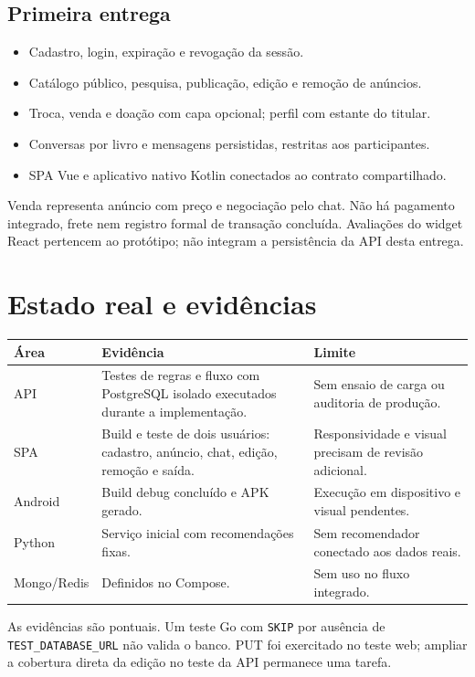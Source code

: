\documentclass[11pt,a4paper]{article}
\begin{document}
\subsection{Primeira entrega}
\begin{itemize}
\item Cadastro, login, expiração e revogação da sessão.
\item Catálogo público, pesquisa, publicação, edição e remoção de anúncios.
\item Troca, venda e doação com capa opcional; perfil com estante do titular.
\item Conversas por livro e mensagens persistidas, restritas aos participantes.
\item SPA Vue e aplicativo nativo Kotlin conectados ao contrato compartilhado.
\end{itemize}
Venda representa anúncio com preço e negociação pelo chat. Não há pagamento integrado, frete nem registro formal de transação concluída. Avaliações do widget React pertencem ao protótipo; não integram a persistência da API desta entrega.
\section{Estado real e evidências}
\par\medskip\noindent\begin{tabularx}{\textwidth}{@{}p{25mm}Y >{\raggedright\arraybackslash}p{42mm}@{}}\toprule Área & Evidência & Limite\\\midrule
API & Testes de regras e fluxo com PostgreSQL isolado executados durante a implementação. & Sem ensaio de carga ou auditoria de produção.\\
SPA & Build e teste de dois usuários: cadastro, anúncio, chat, edição, remoção e saída. & Responsividade e visual precisam de revisão adicional.\\
Android & Build debug concluído e APK gerado. & Execução em dispositivo e visual pendentes.\\
Python & Serviço inicial com recomendações fixas. & Sem recomendador conectado aos dados reais.\\
Mongo/Redis & Definidos no Compose. & Sem uso no fluxo integrado.\\\bottomrule\end{tabularx}\par\medskip
As evidências são pontuais. Um teste Go com \texttt{SKIP} por ausência de \texttt{TEST\_DATABASE\_URL} não valida o banco. PUT foi exercitado no teste web; ampliar a cobertura direta da edição no teste da API permanece uma tarefa.
\end{document}
